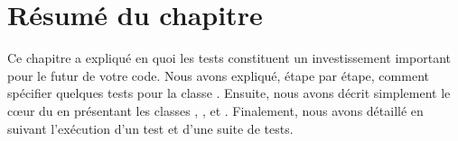 \documentclass[a4paper,10pt,twoside]{book}
\begin{document}
{%



\section{Résumé du chapitre}

Ce chapitre a expliqué en quoi les tests constituent un investissement important pour le futur de votre code.
Nous avons expliqué, étape par étape, comment spécifier quelques tests pour la classe .
Ensuite, nous avons décrit simplement le c{\oe}ur du \framework \sunit en présentant les 
classes , ,  et . Finalement, nous avons 
détaillé \sunit en suivant l'exécution d'un test et d'une suite de tests.

}
\end{document}
